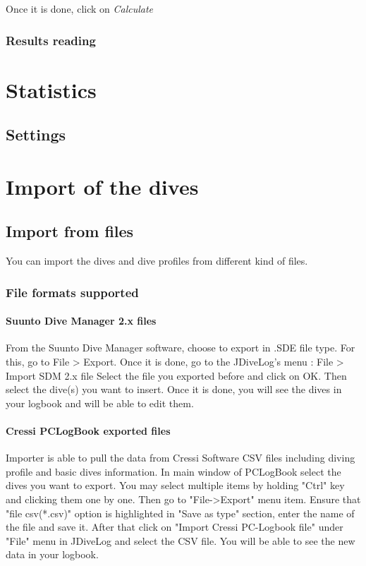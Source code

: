 \documentclass[10pt,a4paper,titlepage]{report}
\begin{document}
Once it is done, click on \emph{Calculate}

\subsection{Results reading}

\chapter{Statistics}
\section{Settings}
\chapter{Import of the dives}
\section{Import from files}
You can import the dives and dive profiles from different kind of files.
\subsection{File formats supported}
\subsubsection{Suunto Dive Manager 2.x files}
From the Suunto Dive Manager software, choose to export in .SDE file type. For this, go to File > Export.
Once it is done, go to the JDiveLog's menu : File > Import SDM 2.x file 
Select the file you exported before and click on OK. Then select the dive(s) you want to insert.
Once it is done, you will see the dives in your logbook and will be able to edit them.
\subsubsection{Cressi PCLogBook exported files}
Importer is able to pull the data from Cressi Software CSV files including diving profile and basic dives information.
In main window of PCLogBook select the dives you want to export. You may select multiple items by holding "Ctrl" key and clicking them one by one. Then go to "File->Export" menu item. Ensure that "file csv(*.csv)" option is highlighted in "Save as type" section, enter the name of the file and save it.
After that click on "Import Cressi PC-Logbook file" under "File" menu in JDiveLog and select the CSV file.
You will be able to see the new data in your logbook.
\end{document}
